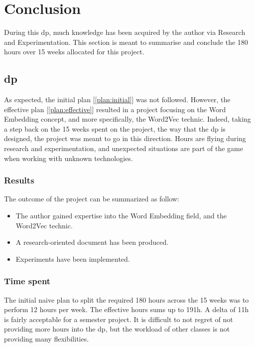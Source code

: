 \chapter{Conclusion}
\label{chap:conclusion}
During this \gls{dp}, much knowledge has been acquired by the author via Research and Experimentation. This section is meant to summarise and conclude the 180 hours over 15 weeks allocated for this project.

\section{\gls{dp}}
As expected, the initial plan [\ref{plan:initial}] was not followed. However, the effective plan [\ref{plan:effective}] resulted in a project focusing on the Word Embedding concept, and more specifically, the Word2Vec technic. Indeed, taking a step back on the 15 weeks spent on the project, the way that the \gls{dp} is designed, the project was meant to go in this direction. Hours are flying during research and experimentation, and unexpected situations are part of the game when working with unknown technologies.

\subsection{Results}
The outcome of the project can be summarized as follow:

\begin{itemize}
\setlength\itemsep{0em}
    \item The author gained expertise into the Word Embedding field, and the Word2Vec technic.
    \item A research-oriented document has been produced.
    \item Experiments have been implemented.
\end{itemize}


\subsection{Time spent}
The initial naive plan to split the required 180 hours across the 15 weeks was to perform 12 hours per week. The effective hours sums up to 191h. A delta of 11h is fairly acceptable for a semester project. It is difficult to not regret of not providing more hours into the \gls{dp}, but the workload of other classes is not providing many flexibilities.

